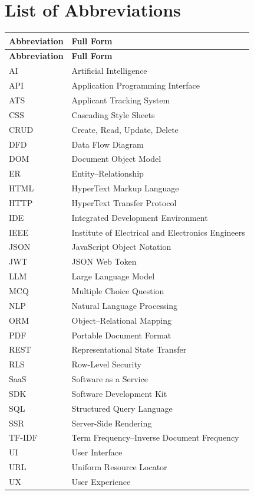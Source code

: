 \chapter*{List of Abbreviations}

\begin{longtable}{p{1.5in}p{4.5in}}
\textbf{Abbreviation} & \textbf{Full Form}\\
\midrule
\endfirsthead
\textbf{Abbreviation} & \textbf{Full Form}\\
\midrule
\endhead
AI    & Artificial Intelligence\\
API   & Application Programming Interface\\
ATS   & Applicant Tracking System\\
CSS   & Cascading Style Sheets\\
CRUD  & Create, Read, Update, Delete\\
DFD   & Data Flow Diagram\\
DOM   & Document Object Model\\
ER    & Entity--Relationship\\
HTML  & HyperText Markup Language\\
HTTP  & HyperText Transfer Protocol\\
IDE   & Integrated Development Environment\\
IEEE  & Institute of Electrical and Electronics Engineers\\
JSON  & JavaScript Object Notation\\
JWT   & JSON Web Token\\
LLM   & Large Language Model\\
MCQ   & Multiple Choice Question\\
NLP   & Natural Language Processing\\
ORM   & Object--Relational Mapping\\
PDF   & Portable Document Format\\
REST  & Representational State Transfer\\
RLS   & Row-Level Security\\
SaaS  & Software as a Service\\
SDK   & Software Development Kit\\
SQL   & Structured Query Language\\
SSR   & Server-Side Rendering\\
TF-IDF & Term Frequency--Inverse Document Frequency\\
UI    & User Interface\\
URL   & Uniform Resource Locator\\
UX    & User Experience\\
\end{longtable}
\cleardoublepage
